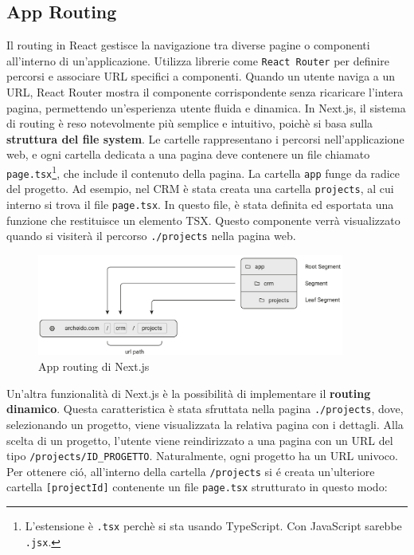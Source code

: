 \documentclass[target=bach,aauheader=,style=]{thud}
\begin{document}
\subsection{App Routing}
Il routing in React gestisce la navigazione tra diverse pagine o componenti all'interno di un'applicazione. Utilizza librerie come \texttt{React Router} per definire percorsi e associare URL specifici a componenti. Quando un utente naviga a un URL, React Router mostra il componente corrispondente senza ricaricare l'intera pagina, permettendo un'esperienza utente fluida e dinamica. In Next.js, il sistema di routing è reso notevolmente più semplice e intuitivo, poichè si basa sulla \textbf{struttura del file system}. Le cartelle rappresentano i percorsi nell'applicazione web, e ogni cartella dedicata a una pagina deve contenere un file chiamato \texttt{page.tsx}\footnote{L'estensione è \texttt{.tsx} perchè si sta usando TypeScript. Con JavaScript sarebbe \texttt{.jsx}.}, che include il contenuto della pagina. La cartella \texttt{app} funge da radice del progetto. Ad esempio, nel CRM è stata creata una cartella \texttt{projects}, al cui interno si trova il file \texttt{page.tsx}. In questo file, è stata definita ed esportata una funzione che restituisce un elemento TSX. Questo componente verrà visualizzato quando si visiterà il percorso \texttt{./projects} nella pagina web.

\begin{figure}[H]
    \centering
    \includegraphics[width=0.9\textwidth]{img/routing.pdf} 
    \caption{App routing \cite{nextjsdocs2024} di Next.js}
\end{figure}

\noindent Un'altra funzionalità di Next.js è la possibilità di implementare il \textbf{routing dinamico}. Questa caratteristica è stata sfruttata nella pagina \texttt{./projects}, dove, selezionando un progetto, viene visualizzata la relativa pagina con i dettagli. Alla scelta di un progetto, l'utente viene reindirizzato a una pagina con un URL del tipo \texttt{/projects/ID\_PROGETTO}. Naturalmente, ogni progetto ha un URL univoco. Per ottenere ció, all'interno della cartella \texttt{/projects} si é creata un'ulteriore cartella \texttt{[projectId]} contenente un file \texttt{page.tsx} strutturato in questo modo:
\end{document}
